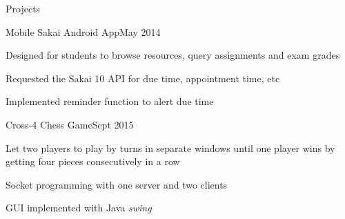 \documentclass{resume} %
\begin{document}
\begin{rSection}{Projects}

	\begin{rSubsection}{Mobile Sakai Android App}{May 2014}{}{}
	\item Designed for students to browse resources, query assignments and exam grades
	\item Requested the Sakai 10 API for due time, appointment time, etc
	\item Implemented reminder function to alert due time
	\end{rSubsection}
	
	
	\begin{rSubsection}{Cross-4 Chess Game}{Sept 2015}{}{}
		\item Let two players to play by turns in separate windows until one player wins by getting four pieces consecutively in a row 
		\item Socket programming with one server and two clients
		\item GUI implemented with Java \textit{swing}		
	\end{rSubsection}

\end{rSection}
\end{document}
